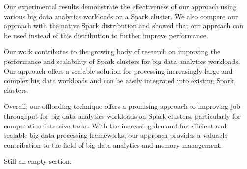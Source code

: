 \documentclass[twocolumn,10pt]{asme2e}
\begin{document}
Our experimental results demonstrate the effectiveness of our approach using various big data analytics workloads on a Spark cluster. We also compare our approach with the native Spark distribution and showed that our approach can be used instead of this distribution to further improve performance.

Our work contributes to the growing body of research on improving the performance and scalability of Spark clusters for big data analytics workloads. Our approach offers a scalable solution for processing increasingly large and complex big data workloads and can be easily integrated into existing Spark clusters.

Overall, our offloading technique offers a promising approach to improving job throughput for big data analytics workloads on Spark clusters, particularly for computation-intensive tasks. With the increasing demand for efficient and scalable big data processing frameworks, our approach provides a valuable contribution to the field of big data analytics and memory management.




\begin{acknowledgment}
	Still an empty section.
\end{acknowledgment}

%



\nocite{*}
\end{document}
